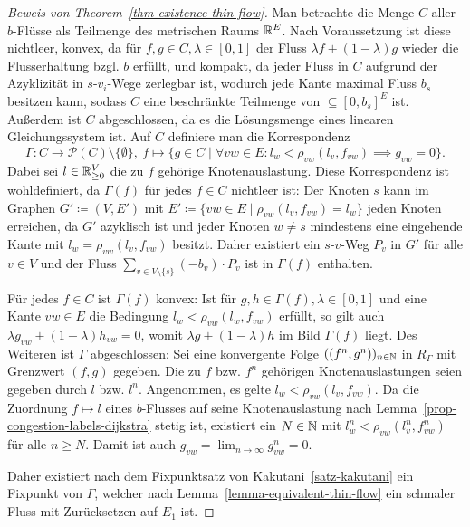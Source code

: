 \begin{proof}[Beweis von Theorem~\ref{thm-existence-thin-flow}]
	Man betrachte die Menge $C$ aller $b$-Flüsse als Teilmenge des metrischen Raums $\mathbb{R}^E$.
	Nach Voraussetzung ist diese nichtleer, konvex, da für $f, g\in C, \lambda \in [0,1]$ der Fluss $\lambda f + (1-\lambda)g$ wieder die Flusserhaltung bzgl. $b$ erfüllt, und kompakt, da jeder Fluss in $C$ aufgrund der Azyklizität in $s$-$v_i$-Wege zerlegbar ist, wodurch jede Kante maximal Fluss $b_s$ besitzen kann, sodass $C$ eine beschränkte Teilmenge von $\subseteq [0, b_s]^E$ ist.
	Außerdem ist $C$ abgeschlossen, da es die Lösungsmenge eines linearen Gleichungssystem ist.
	Auf $C$ definiere man die Korrespondenz
	\[
	\Gamma: C\to \mathcal{P}(C)\setminus\{ \emptyset \}, ~ f\mapsto \{ g\in C \mid \forall vw\in E: l_w < \rho_{vw}(l_v, f_{vw}) \implies g_{vw} = 0 \}.
	\]
	Dabei sei $l\in\mathbb{R}_{\geq 0}^V$ die zu $f$ gehörige Knotenauslastung.
	Diese Korrespondenz ist wohldefiniert, da $\Gamma(f)$ für jedes $f\in C$ nichtleer ist:
	Der Knoten $s$ kann im Graphen $G'\coloneq (V, E')$ mit $E'\coloneq \{ vw\in E \mid \rho_{vw}(l_v, f_{vw})=l_w \}$ jeden Knoten erreichen, da $G'$ azyklisch ist und jeder Knoten $w\neq s$ mindestens eine eingehende Kante mit $l_w = \rho_{vw}(l_v, f_{vw})$ besitzt. 
	Daher existiert ein $s$-$v$-Weg $P_v$ in $G'$ für alle $v\in V$ und der Fluss $\sum_{v\in V\setminus\{ s\}} (-b_v) \cdot P_v$ ist in $\Gamma(f)$ enthalten.
	
	Für jedes $f\in C$ ist $\Gamma(f)$ konvex: Ist für $g, h\in \Gamma(f), \lambda\in [0,1]$ und eine Kante $vw\in E$ die Bedingung $l_w < \rho_{vw}(l_w, f_{vw})$ erfüllt, so gilt auch $\lambda g_{vw} + (1-\lambda) h_{vw} = 0$, womit $\lambda g + (1-\lambda)h$ im Bild $\Gamma(f)$ liegt.
	Des Weiteren ist $\Gamma$ abgeschlossen: 
	Sei eine konvergente Folge $((f^{n}, g^{n}))_{n\in\mathbb{N}}$ in $R_\Gamma$ mit Grenzwert $(f, g)$ gegeben.
	Die zu $f$ bzw. $f^n$ gehörigen Knotenauslastungen seien gegeben durch $l$ bzw. $l^n$.
	Angenommen, es gelte $l_w < \rho_{vw}(l_v, f_{vw})$.
	Da die Zuordnung $f\mapsto l$ eines $b$-Flusses auf seine Knotenauslastung nach Lemma~\ref{prop-congestion-labels-dijkstra} stetig ist, existiert ein $N\in\mathbb{N}$ mit $l_w^n<\rho_{vw}(l_v^n, f_{vw}^n)$ für alle $n\geq N$.
	Damit ist auch $g_{vw} = \lim_{n\to\infty} g_{vw}^n = 0$.
	
	Daher existiert nach dem Fixpunktsatz von Kakutani~\ref{satz-kakutani} ein Fixpunkt von $\Gamma$, welcher nach Lemma~\ref{lemma-equivalent-thin-flow} ein schmaler Fluss mit Zurücksetzen auf $E_1$ ist.
\end{proof}

